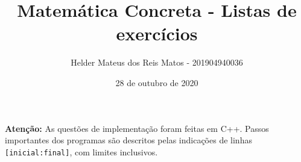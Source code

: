 \documentclass[12pt]{article}
\title{Matemática Concreta - Listas de exercícios}
\author{Helder Mateus dos Reis Matos - 201904940036}
\date{28 de outubro de 2020}
\begin{document}
\maketitle

\textbf{Atenção: } As questões de implementação foram feitas em C++. Passos importantes dos programas são descritos pelas indicações de linhas \verb|[inicial:final]|, com limites inclusivos.

\setcounter{section}{1}

\pagebreak

\setcounter{section}{3}

\pagebreak

\setcounter{section}{5}

\pagebreak

\setcounter{section}{7}

\end{document}

